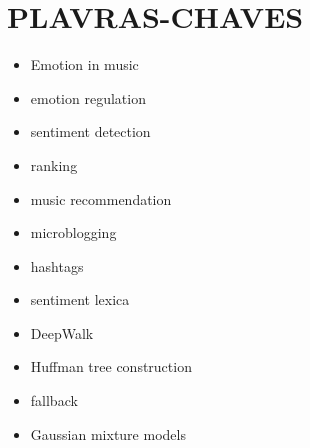 \documentclass{article}
\begin{document}
\section{PLAVRAS-CHAVES}

\begin{itemize}
 \item Emotion in music
 \item emotion regulation
 \item sentiment detection
 \item ranking
 \item music recommendation
 \item microblogging
 \item hashtags
 \item sentiment lexica
 \item DeepWalk
 \item Huffman tree construction
 \item fallback
 \item Gaussian mixture models 
\end{itemize}
\end{document}
